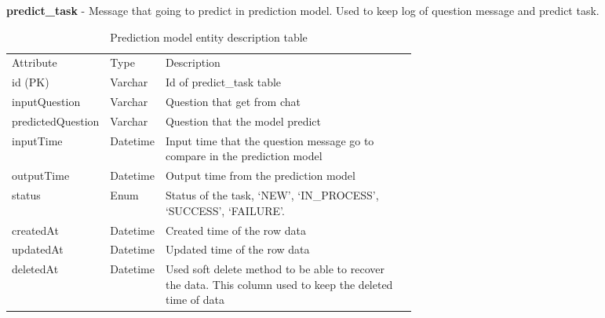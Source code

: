 \documentclass[12pt,oneside,openright,a4paper]{cpe-english-project}
\begin{document}
\textbf{predict\_task} - Message that going to predict in prediction model. Used to keep log of question message and predict task.
\begin{table}[ht]
	\caption{Prediction model entity description table}
	\label{tab:Prediction model entity description table}
\begin{adjustbox}{width=\textwidth}
\begin{tabular}{llp{0.6\linewidth}l}
\rowcolor[HTML]{5B9BD5} 
Attribute         & Type     & Description                                                                                                 \\
\rowcolor[HTML]{DEEAF6} 
id (PK)           & Varchar  & Id of predict\_task table                                                                                   \\
inputQuestion     & Varchar  & Question that get from chat                                                                            \\
\rowcolor[HTML]{DEEAF6} 
predictedQuestion & Varchar  & Question that the model predict                                                                             \\
inputTime         & Datetime & Input time that the   question message go to compare in the prediction model                                \\
\rowcolor[HTML]{DEEAF6} 
outputTime        & Datetime & Output time from the prediction model                                                                       \\
status            & Enum     & Status of the task,   ‘NEW’, ‘IN\_PROCESS’, ‘SUCCESS’, ‘FAILURE’.                                           \\
\rowcolor[HTML]{DEEAF6} 
createdAt         & Datetime & Created time of the row data                                                                                \\
updatedAt         & Datetime & Updated time of the row   data                                                                              \\
\rowcolor[HTML]{DEEAF6} 
deletedAt         & Datetime & Used soft delete method to be able to recover the data. This column   used to keep the deleted time of data
\end{tabular}
\end{adjustbox}
\end{table}
\end{document}
